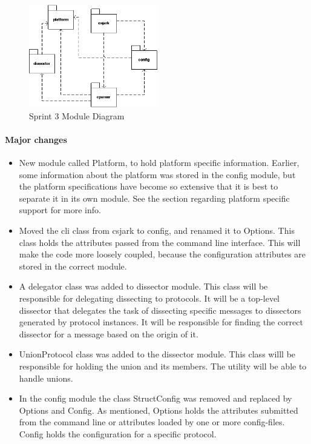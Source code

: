 \begin{figure}[htbp]
	\center
	\includegraphics[width=0.5\textwidth]{./sprints/img/sp3modulediagram}
	\caption{Sprint 3 Module Diagram\label{fig:modulesp3}}
\end{figure}

\paragraph{Major changes}
\begin{itemize}
\item New module called Platform, to hold platform specific information. Earlier, some information about the platform was stored in the config module, but the platform specifications have become so extensive that it is best to separate it in its own module. See the section regarding platform specific support for more info.
\item Moved the \gls{cli} class from csjark to config, and renamed it to Options. This class holds the attributes passed from the command line interface. This will make the code more loosely coupled, because the configuration attributes are stored in the correct module. 
\item A delegator class was added to \gls{dissector} module. This class will be responsible for delegating dissecting to \glspl{protocol}. It will be a top-level \gls{dissector} that delegates the task of dissecting specific messages to \glspl{dissector} generated by \gls{protocol} instances. It will be responsible for finding the correct \gls{dissector} for a message based on the origin of it.
\item UnionProtocol class was added to the \gls{dissector} module. This class willl be responsible for holding the \gls{union} and its \glspl{member}. The \gls{utility} will be able to handle \glspl{union}. 
\item In the config module the class StructConfig was removed and replaced by Options and Config. As mentioned, Options holds the attributes submitted from the command line or attributes loaded by one or more config-files. Config holds the configuration for a specific \gls{protocol}.

\end{itemize}

